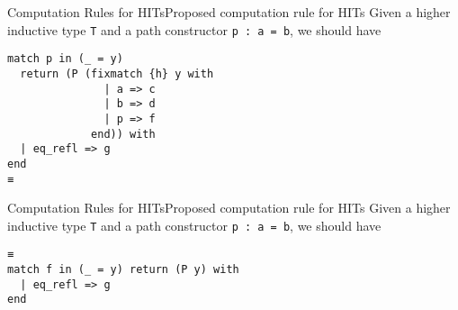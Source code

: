 \documentclass{beamer}
\begin{document}
\begin{frame}[fragile]{Computation Rules for HITs}{Proposed computation rule for HITs}
\Large
Given a higher inductive type \verb|T| and a path constructor \verb|p : a = b|, we should have
\begin{verbatim}
match p in (_ = y)
  return (P (fixmatch {h} y with 
               | a => c
               | b => d
               | p => f
             end)) with
  | eq_refl => g
end
≡
\end{verbatim}
\end{frame}


\begin{frame}[fragile]{Computation Rules for HITs}{Proposed computation rule for HITs}
\Large
Given a higher inductive type \verb|T| and a path constructor \verb|p : a = b|, we should have
\begin{verbatim}
≡
match f in (_ = y) return (P y) with
  | eq_refl => g
end





\end{verbatim}
\end{frame}
\end{document}
